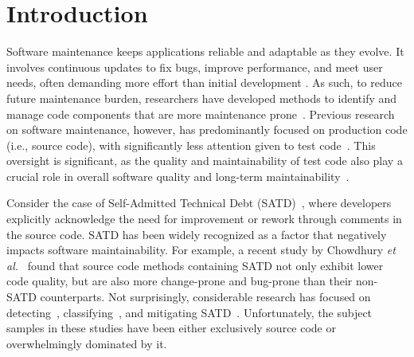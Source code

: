\section{Introduction}

Software maintenance keeps applications reliable and adaptable as they evolve. It involves continuous updates to fix bugs, improve performance, and meet user needs, often demanding more effort than initial development \cite{kafura_use_1987, borstler_role_2016}. As such, to reduce future maintenance burden, researchers have developed methods to identify and manage code components that are more maintenance prone~\cite{pascarella_performance_2020, chowdhury_method-level_2024, romano_using_2011, chowdhury_revisiting_2022, zhou_ability_2010,grund_codeshovel_2021, palomba_exploratory_2017}.
Previous research on software maintenance, however, has predominantly focused on production code (i.e., source code), with significantly less attention given to test code~\cite{winkler_investigating_2024, tahir_empirical_2016}. This oversight is significant, as the quality and maintainability of test code also play a crucial role in overall software quality and long-term maintainability~\cite{spadini_relation_2018, zaidman_studying_2011, vahabzadeh_empirical_2015}.

Consider the case of Self-Admitted Technical Debt (SATD)~\cite{potdar_exploratory_2014, wehaibi_examining_2016, seaman_technical_2015, zazworka_investigating_2011, spinola_investigating_2013, guo_tracking_2011,xiao_quantifying_2024,cassee_self-admitted_2022}, where developers explicitly acknowledge the need for improvement or rework through comments in the source code. SATD has been widely recognized as a factor that negatively impacts software maintainability. For example, a recent study by Chowdhury \textit{et al.}~\cite{chowdhury_evidence_2025} found that source code methods containing SATD not only exhibit lower code quality, but are also more change-prone and bug-prone than their non-SATD counterparts. Not surprisingly, considerable research has focused on detecting~\cite{maldonado_detecting_2015, liu_satd_2018, huang_identifying_2018, li_automatic_2023, sheikhaei_empirical_2024, maldonado_using_2017,gama_towards_2024, rantala_prevalence_2020}, classifying~\cite{zhu_detecting_2021, maldonado_detecting_2015, obrien_artifact_2022, bhatia_empirical_2025}, and mitigating SATD~\cite{maldonado_empirical_2017, zampetti_was_2018, zampetti_automatically_2020, iammarino_empirical_2021, liu_exploratory_2021, mastropaolo_towards_2023}. Unfortunately, the subject samples in these studies have been either exclusively source code or overwhelmingly dominated by it.

